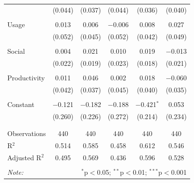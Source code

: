 \begin{table}[!htbp]
\begin{tabular}{@{\extracolsep{5pt}}lccccc}
  & (0.044) & (0.037) & (0.044) & (0.036) & (0.040) \\ 
  & & & & & \\ 
 Usage & 0.013 & 0.006 & $-$0.006 & 0.008 & 0.027 \\ 
  & (0.052) & (0.045) & (0.052) & (0.042) & (0.049) \\ 
  & & & & & \\ 
 Social & 0.004 & 0.021 & 0.010 & 0.019 & $-$0.013 \\ 
  & (0.022) & (0.019) & (0.023) & (0.018) & (0.021) \\ 
  & & & & & \\ 
 Productivity & 0.011 & 0.046 & 0.002 & 0.018 & $-$0.060 \\ 
  & (0.042) & (0.037) & (0.045) & (0.040) & (0.035) \\ 
  & & & & & \\ 
 Constant & $-$0.121 & $-$0.182 & $-$0.188 & $-$0.421$^{*}$ & 0.053 \\ 
  & (0.260) & (0.226) & (0.272) & (0.214) & (0.234) \\ 
  & & & & & \\ 
\hline \\[-1.8ex] 
Observations & 440 & 440 & 440 & 440 & 440 \\ 
R$^{2}$ & 0.514 & 0.585 & 0.458 & 0.612 & 0.546 \\ 
Adjusted R$^{2}$ & 0.495 & 0.569 & 0.436 & 0.596 & 0.528 \\ 
\hline 
\hline \\[-1.8ex] 
\textit{Note:}  & \multicolumn{5}{r}{$^{*}$p$<$0.05; $^{**}$p$<$0.01; $^{***}$p$<$0.001} \\ 
\end{tabular} 
\end{table} 
